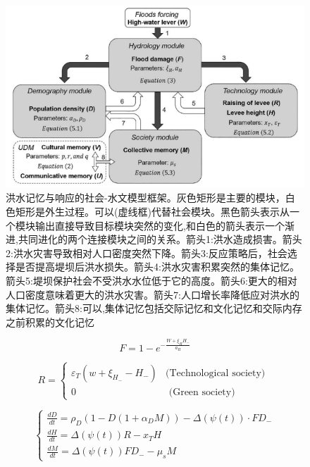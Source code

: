 \begin{figure}[!htb] %
    \centering
    \includegraphics[width=\textwidth]{img/ch3/ch3_model_diagram.png}
    \caption[洪水记忆与响应的社会-水文模型框架]{洪水记忆与响应的社会-水文模型框架。灰色矩形是主要的模块，白色矩形是外生过程。可以(虚线框)代替社会模块。黑色箭头表示从一个模块输出直接导致目标模块突然的变化,和白色的箭头表示一个渐进,共同进化的两个连接模块之间的关系。箭头1:洪水造成损害。箭头2:洪水灾害导致相对人口密度突然下降。箭头3:反应策略后，社会选择是否提高堤坝后洪水损失。箭头4:洪水灾害积累突然的集体记忆。箭头5:堤坝保护社会不受洪水水位低于它的高度。箭头6:更大的相对人口密度意味着更大的洪水灾害。箭头7:人口增长率降低应对洪水的集体记忆。箭头8:可以,集体记忆包括交际记忆和文化记忆和交际内存之前积累的文化记忆}
    \label{fig:ch3:model_diagram}
\end{figure}

\begin{equation}
    \label{eq:ch3:flood_generator}
    F=1-e^{-\frac{W+\xi_H H_{-}}{a_H}}
\end{equation}

\begin{equation}
    \label{eq:ch3:response}
    R=\left\{\begin{array}{rr}
    \varepsilon_T\left(w+\xi_{H_{-}}-H_{-}\right) & (\text {Technological society) } \\
    0 & \text { (Green society) }
    \end{array}\right.
\end{equation}

\begin{equation}
    \label{eq:ch3:models}
    \left\{\begin{array}{l}
    \frac{d D}{d t}=\rho_D\left(1-D\left(1+\alpha_D M\right)\right)-\Delta(\psi(t)) \cdot F D_{-} \\
    \frac{d H}{d t}=\Delta(\psi(t)) R-x_T H \\
    \frac{d M}{d t}=\Delta(\psi(t)) F D_{-}-\mu_s M
    \end{array}\right.
\end{equation}
